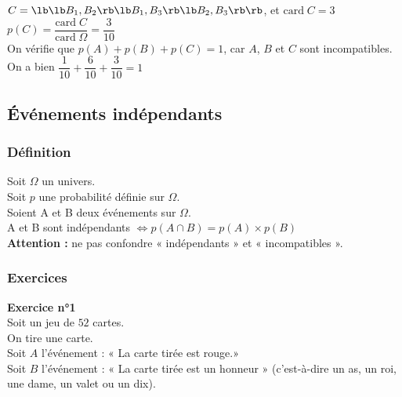$C = \lb  \lb B_1, B_2 \rb \lb B_1, B_3 \rb \lb B_2, B_3 \rb \rb $, et $\mathrm{card} \; C = 3 $ \\

$ p\left(C\right) = \dfrac{\mathrm{card} \; C}{\mathrm{card} \; \Omega} = \dfrac{3}{10} $ \\

On vérifie que $p\left(A\right) + p\left(B\right) + p\left(C\right) = 1 $, car $A$, $B$ et $C$ sont incompatibles. \\

On a bien $\dfrac{1}{10} + \dfrac{6}{10} + \dfrac{3}{10} = 1 $

\newpage 

\subsection{Événements indépendants}

\subsubsection{Définition}

Soit $\Omega$ un univers. \\ Soit $p$ une probabilité définie sur $\Omega$. \\ Soient A et B deux événements sur $\Omega$. \\

A et B sont indépendants $ \Longleftrightarrow p\left(A \cap B \right) = p\left(A\right) \times p\left(B\right) $ \\

\textbf{Attention :} ne pas confondre « indépendants » et « incompatibles ». 

\subsubsection{Exercices}

\textbf{Exercice n°1} \\

Soit un jeu de $52$ cartes. \\

On tire une carte. \\

Soit $A$ l'événement : « La carte tirée est rouge.» \\
Soit $B$ l'événement : « La carte tirée est un honneur » (c'est-à-dire un as, un roi, une dame, un valet ou un dix). \\

